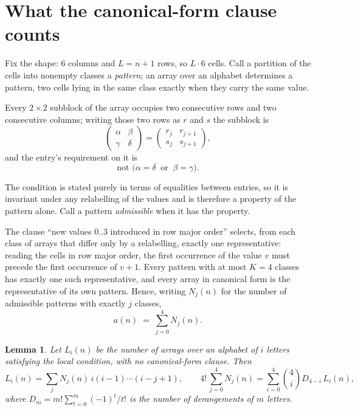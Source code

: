 \documentclass[11pt,a4paper]{article}
\theoremstyle{plain}
\newtheorem{lemma}[theorem]{Lemma}
\theoremstyle{definition}
\begin{document}
\section{What the canonical-form clause counts}

Fix the shape: $6$ columns and $L=n+1$ rows, so $L\cdot6$ cells. Call a
partition of the cells into nonempty classes a \emph{pattern}; an array over an alphabet
determines a pattern, two cells lying in the same class exactly when they carry the same
value.

Every $2\times2$ subblock of the array occupies two consecutive
rows and two consecutive columns; writing those two rows as $r$ and $s$ the
subblock is
\[
\begin{pmatrix}\alpha&\beta\\\gamma&\delta\end{pmatrix}=\begin{pmatrix}r_j&r_{j+1}\\s_j&s_{j+1}\end{pmatrix},
\]
and the entry's requirement on it is
\begin{equation}\label{eq:loc}
\text{not }\bigl(\alpha=\delta\ \text{ or }\ \beta=\gamma\bigr).
\end{equation}

The condition is stated purely in terms of equalities between entries, so it is invariant
under any relabelling of the values and is therefore a property of the pattern alone. Call a
pattern \emph{admissible} when it has the property.

The clause ``new values $0..3$ introduced in row major order'' selects, from each class
of arrays that differ only by a relabelling, exactly one representative: reading the cells in
row major order, the first occurrence of the value $v$ must precede the first occurrence of
$v+1$. Every pattern with at most $K=4$ classes has exactly one such representative, and
every array in canonical form is the representative of its own pattern. Hence, writing
$N_j(n)$ for the number of admissible patterns with exactly $j$ classes,
\begin{equation}\label{eq:apat}
a(n)\;=\;\sum_{j=0}^{4}N_j(n).
\end{equation}

\begin{lemma}\label{lem:inv}
Let $L_i(n)$ be the number of arrays over an alphabet of $i$ letters satisfying the local
condition, with no canonical-form clause. Then
\[
L_i(n)=\sum_j N_j(n)\,i(i-1)\cdots(i-j+1),
\qquad
4!\,\sum_{j=0}^{4}N_j(n)=\sum_{i=0}^{4}\binom{4}{i}D_{4-i}\,L_i(n),
\]
where $D_m=m!\sum_{t=0}^{m}(-1)^t/t!$ is the number of derangements of $m$ letters.
\end{lemma}
\end{document}
